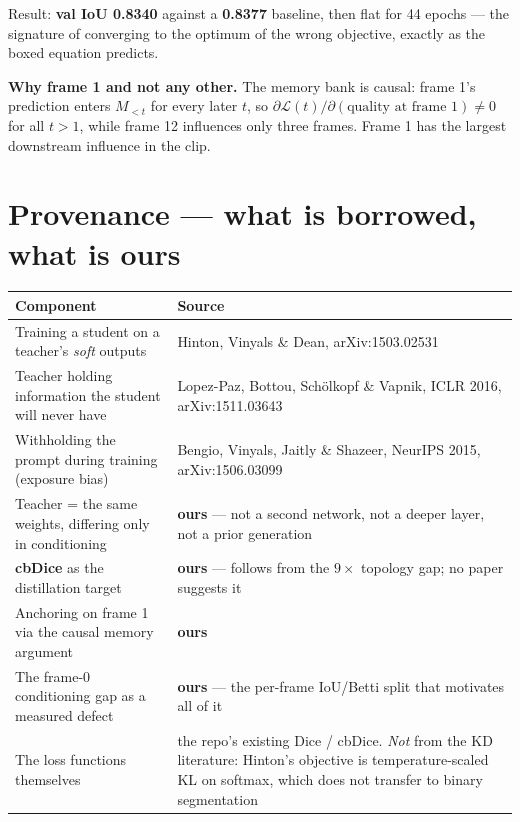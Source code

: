 \documentclass[9pt,a4paper]{extarticle}
\begin{document}
Result: \textbf{val IoU 0.8340} against a \textbf{0.8377} baseline, then flat for 44 epochs --- the signature of
converging to the optimum of the wrong objective, exactly as the boxed equation predicts.

\textbf{Why frame 1 and not any other.} The memory bank is causal: frame 1's prediction enters $M_{<t}$ for every
later $t$, so $\partial\mathcal{L}(t)/\partial(\text{quality at frame }1)\neq 0$ for all $t>1$, while frame 12
influences only three frames. Frame 1 has the largest downstream influence in the clip.

\section{Provenance --- what is borrowed, what is ours}
\begin{center}
\begin{tabular}{>{\raggedright\arraybackslash}p{7.4cm}>{\raggedright\arraybackslash}p{9.4cm}}
\toprule
\textbf{Component} & \textbf{Source} \\
\midrule
Training a student on a teacher's \emph{soft} outputs & Hinton, Vinyals \& Dean, arXiv:1503.02531 \\
Teacher holding information the student will never have & Lopez-Paz, Bottou, Sch\"olkopf \& Vapnik, ICLR 2016, arXiv:1511.03643 \\
Withholding the prompt during training (exposure bias) & Bengio, Vinyals, Jaitly \& Shazeer, NeurIPS 2015, arXiv:1506.03099 \\
\textcolor{ours}{Teacher = the same weights, differing only in conditioning} & \textcolor{ours}{\textbf{ours}} --- not a second network, not a deeper layer, not a prior generation \\
\textcolor{ours}{\textbf{cbDice} as the distillation target} & \textcolor{ours}{\textbf{ours}} --- follows from the $9\times$ topology gap; no paper suggests it \\
\textcolor{ours}{Anchoring on frame 1 via the causal memory argument} & \textcolor{ours}{\textbf{ours}} \\
\textcolor{ours}{The frame-0 conditioning gap as a measured defect} & \textcolor{ours}{\textbf{ours}} --- the per-frame IoU/Betti split that motivates all of it \\
The loss functions themselves & the repo's existing Dice / cbDice. \emph{Not} from the KD literature: Hinton's objective is temperature-scaled KL on softmax, which does not transfer to binary segmentation \\
\bottomrule
\end{tabular}
\end{center}
\end{document}
